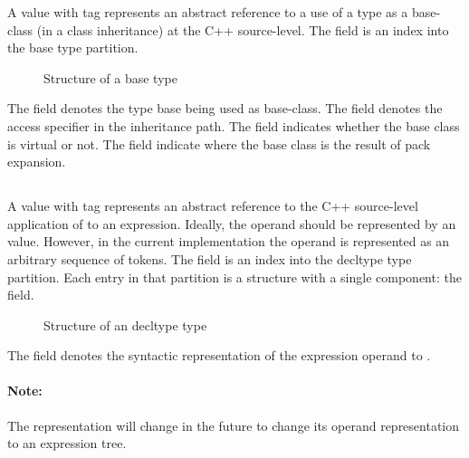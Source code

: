 A  value with tag  represents an
abstract reference to a use of a type as a base-class (in a class inheritance)
at the C++ source-level.
The  field is an index into the base type partition.
%
\begin{figure}[H]
	\centering
	\caption{Structure of a base type}
	\label{fig:ifc-base-type-structure}
\end{figure}
%
The  field denotes the type base being used as base-class.
The  field denotes the access specifier in the inheritance path.
The  field indicates whether the base class is virtual or not.
The  field indicate where the base class is the result of pack expansion.




\subsection{}
\label{sec:ifc:TypeSort:Decltype}

A  value with tag  represents
an abstract reference to the C++ source-level application of  to
an expression. Ideally, the operand should be represented by an 
value.  However, in the current implementation the operand is represented
as an arbitrary sequence of tokens.
The  field is an index into the decltype type partition.
Each entry in that partition is a structure with a single component: the  field.
%
\begin{figure}[H]
	\centering
	\caption{Structure of an decltype type}
	\label{fig:ifc-decltype-type-structure}
\end{figure}
%
The  field denotes the syntactic representation of the expression operand to .


\paragraph{Note:} The  representation will change in the future to change its operand representation to an expression tree.

